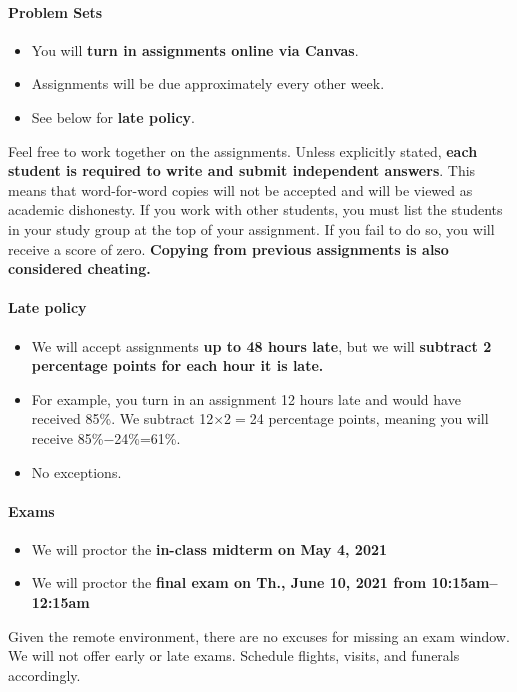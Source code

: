 \documentclass[10pt]{article}
\begin{document}
\paragraph{Problem Sets}
\begin{itemize}
  \item You will \textbf{turn in assignments online via Canvas}.
  \item Assignments will be due approximately every other week.
  \item See below for \textbf{late policy}.
\end{itemize}
Feel free to work together on the assignments. Unless explicitly stated, \textbf{each student is required to write and submit independent answers}. This means that word-for-word copies will not be accepted and will be viewed as academic dishonesty. If you work with other students, you must list the students in your study group at the top of your assignment. If you fail to do so, you will receive a score of zero. \textbf{Copying from previous assignments is also considered cheating.}

\paragraph{Late policy}
\begin{itemize}
  \item We will accept assignments \textbf{up to 48 hours late}, but we will \textbf{subtract 2 percentage points for each hour it is late.}
  \item For example, you turn in an assignment 12 hours late and would have received 85\%. We subtract 12$\times$2$=$24 percentage points, meaning you will receive 85\%$-$24\%=61\%.
  \item No exceptions.
\end{itemize}

\paragraph{Exams}
\begin{itemize}
  \item We will proctor the \textbf{in-class midterm on May 4, 2021} 
  \item We will proctor the \textbf{final exam on Th., June 10, 2021 from 10:15am--12:15am} 
\end{itemize}
Given the remote environment, there are no excuses for missing an exam window. We will not offer early or late exams. Schedule flights, visits, and funerals accordingly.
\end{document}
